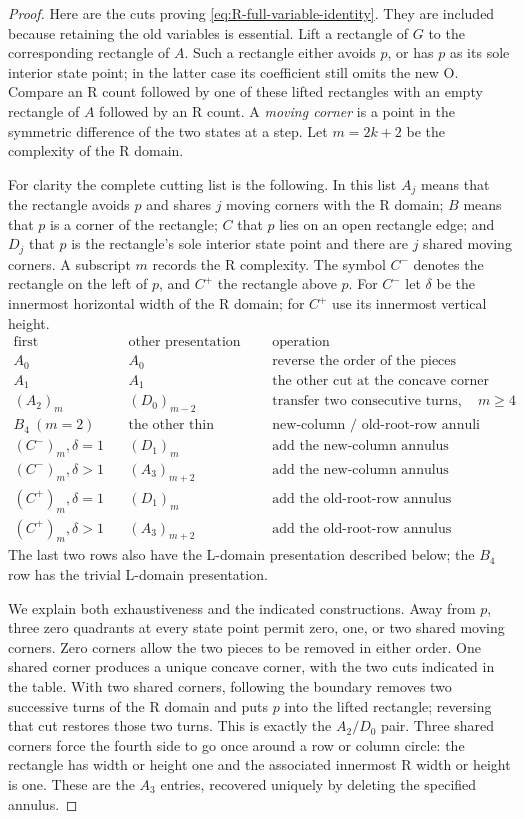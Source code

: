 \documentclass[11pt,a4paper]{article}
\theoremstyle{remark}
\begin{document}
\begin{proof}
Here are the cuts proving \eqref{eq:R-full-variable-identity}.  They
are included because retaining the old variables is essential.  Lift
a rectangle of $G$ to the corresponding rectangle of $A$.  Such a
rectangle either avoids $p$, or has $p$ as its sole interior state
point; in the latter case its coefficient still omits the new O.
Compare an R count followed by one of these lifted rectangles with
an empty rectangle of $A$ followed by an R count.  A \emph{moving corner} is a
point in the symmetric difference of the two states at a step.  Let
$m=2k+2$ be the complexity of the R domain.

For clarity the complete cutting list is the following.  In this
list $A_j$ means that the rectangle avoids $p$ and shares $j$ moving
corners with the R domain; $B$ means that $p$ is a corner of the
rectangle; $C$ that $p$ lies on an open rectangle edge; and $D_j$ that
$p$ is the rectangle's sole interior state point and there are $j$
shared moving corners.  A subscript $m$ records the R complexity.
The symbol $C^-$ denotes the rectangle on the left of $p$, and
$C^+$ the rectangle above $p$.  For $C^-$ let $\delta$ be the
innermost horizontal width of the R domain; for $C^+$ use its
innermost vertical height.
\[
\begin{array}{c|c|c}
\text{first presentation}&\text{other presentation}&\text{operation}\\\hline
A_0&A_0&\text{reverse the order of the pieces}\\
A_1&A_1&\text{the other cut at the concave corner}\\
(A_2)_m&(D_0)_{m-2}&\text{transfer two consecutive turns},\quad m\ge4\\
B_4\ (m=2)&\text{the other thin annulus}
       &\text{new-column / old-root-row annuli}\\
(C^-)_m, \delta=1&(D_1)_m&\text{add the new-column annulus}\\
(C^-)_m, \delta>1&(A_3)_{m+2}&\text{add the new-column annulus}\\
(C^+)_m, \delta=1&(D_1)_m&\text{add the old-root-row annulus}\\
(C^+)_m, \delta>1&(A_3)_{m+2}&\text{add the old-root-row annulus}
\end{array}
\]
The last two rows also have the L-domain presentation described below;
the $B_4$ row has the trivial L-domain presentation.

We explain both exhaustiveness and the indicated constructions.
Away from $p$, three zero quadrants at every state point permit zero,
one, or two shared moving corners.  Zero corners allow the two pieces
to be removed in either order.  One shared corner produces a unique
concave corner, with the two cuts indicated in the table.  With two
shared corners, following the boundary removes two successive turns
of the R domain and puts $p$ into the lifted rectangle; reversing
that cut restores those two turns.  This is exactly the $A_2/D_0$
pair.  Three shared corners force the fourth side to go once around
a row or column circle: the rectangle has width or height one and
the associated innermost R width or height is one.  These are the
$A_3$ entries, recovered uniquely by deleting the specified annulus.


\end{proof}
\end{document}
